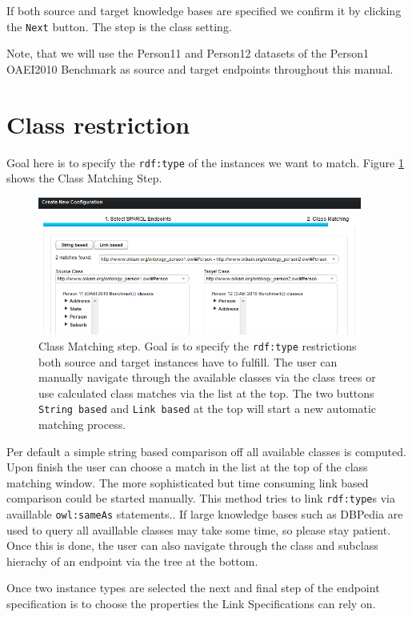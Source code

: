 \documentclass[oneside,a4paper,12pt]{memoir}
\begin{document}
If both source and target knowledge bases are specified we confirm it by clicking the \texttt{Next} button. The step is the class setting.

 Note, that we will use the Person11 and Person12 datasets of the Person1 OAEI2010 Benchmark as source and target endpoints throughout this manual.
	\section{Class restriction}
	\label{classes}
	Goal here is to specify the \texttt{rdf:type} of the instances we want to match. Figure \ref{fig:class} shows the Class Matching Step. 
	\begin{figure}[!h]
		\centering
		\includegraphics[width=0.95\textwidth]{images/class.png}
		\caption{Class Matching step. Goal is to specify the \texttt{rdf:type} restrictions both source and target instances have to fulfill. The user can manually navigate through the available classes via the class trees or use calculated class matches via	the list at the top. The two buttons \texttt{String based} and \texttt{Link based} at the top will start a new automatic matching process.}
		\label{fig:class}
	\end{figure}
	
	Per default a simple string based comparison off all available classes is computed. Upon finish the user can choose a match in the list at the top of the class matching window. The more sophisticated but time consuming link based comparison could be started manually. This method tries to link \texttt{rdf:type}s via availlable \texttt{owl:sameAs} statements.. If large knowledge bases such as DBPedia are used to query all availlable classes may take some time, so please stay patient. Once this is done, the user can also navigate through the class and subclass hierachy of an endpoint via the tree at the bottom.
	
	Once two instance types are selected the next and final step of the endpoint specification is to choose the properties the Link Specifications can rely on.
\end{document}
